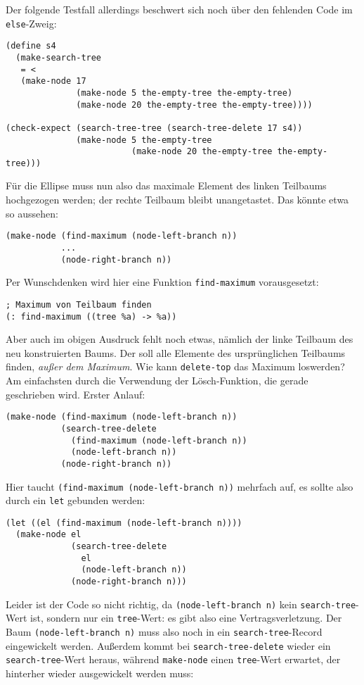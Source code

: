 Der folgende Testfall allerdings beschwert sich noch über den
fehlenden Code im \texttt{else}-Zweig:
%
\begin{verbatim}
(define s4
  (make-search-tree
   = <
   (make-node 17
              (make-node 5 the-empty-tree the-empty-tree)
              (make-node 20 the-empty-tree the-empty-tree))))

(check-expect (search-tree-tree (search-tree-delete 17 s4))
              (make-node 5 the-empty-tree
                         (make-node 20 the-empty-tree the-empty-tree)))
\end{verbatim}
%
Für die Ellipse muss nun also das maximale Element des linken Teilbaums
hochgezogen werden; der rechte Teilbaum bleibt unangetastet.  Das
könnte etwa so aussehen:
%
\begin{verbatim}
(make-node (find-maximum (node-left-branch n))
           ...
           (node-right-branch n))
\end{verbatim}
%
Per Wunschdenken wird hier eine Funktion \texttt{find-maximum}
vorausgesetzt:
%
\begin{verbatim}
; Maximum von Teilbaum finden
(: find-maximum ((tree %a) -> %a))
\end{verbatim}
%
Aber auch im obigen Ausdruck fehlt noch etwas, nämlich der linke
Teilbaum des neu konstruierten Baums.  Der soll alle Elemente des
ursprünglichen Teilbaums finden, \emph{außer dem Maximum}.  Wie kann
\texttt{delete-top} das Maximum loswerden?  Am einfachsten durch die
Verwendung der Lösch-Funktion, die gerade geschrieben wird.  Erster
Anlauf:
%
\begin{verbatim}
(make-node (find-maximum (node-left-branch n))
           (search-tree-delete
             (find-maximum (node-left-branch n))
             (node-left-branch n))
           (node-right-branch n))
\end{verbatim}
%
Hier taucht \texttt{(find-maximum (node-left-branch n))} mehrfach auf,
es sollte also durch ein \texttt{let} gebunden werden:
%
\begin{verbatim}
(let ((el (find-maximum (node-left-branch n))))
  (make-node el
             (search-tree-delete
               el
               (node-left-branch n))
             (node-right-branch n)))
\end{verbatim}
%
Leider ist der Code so nicht richtig, da \texttt{(node-left-branch n)}
kein \texttt{search-tree}-Wert ist, sondern nur ein
\texttt{tree}-Wert: es gibt also eine Vertragsverletzung.  Der Baum
\texttt{(node-left-branch n)} muss also noch in ein
\texttt{search-tree}-Record eingewickelt werden.  Außerdem kommt bei
\texttt{search-tree-delete} wieder ein \texttt{search-tree}-Wert
heraus, während \texttt{make-node} einen \texttt{tree}-Wert erwartet,
der hinterher wieder ausgewickelt werden muss:
%

